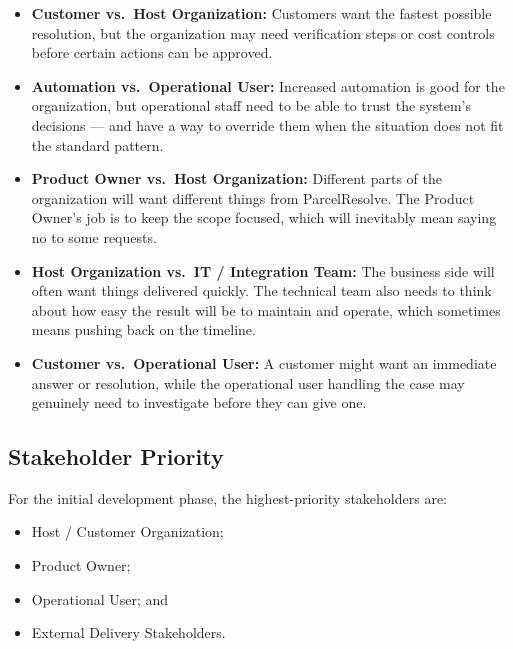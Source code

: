 \documentclass[11pt,a4paper]{article}
\begin{document}
\begin{itemize}

    \item \textbf{Customer vs.\ Host Organization:}
    Customers want the fastest possible resolution, but the
    organization may need verification steps or cost controls before
    certain actions can be approved.

    \item \textbf{Automation vs.\ Operational User:}
    Increased automation is good for the organization, but
    operational staff need to be able to trust the system's
    decisions --- and have a way to override them when the situation
    does not fit the standard pattern.

    \item \textbf{Product Owner vs.\ Host Organization:}
    Different parts of the organization will want different things
    from ParcelResolve. The Product Owner's job is to keep the scope
    focused, which will inevitably mean saying no to some requests.

    \item \textbf{Host Organization vs.\ IT / Integration Team:}
    The business side will often want things delivered quickly.
    The technical team also needs to think about how easy the result
    will be to maintain and operate, which sometimes means pushing
    back on the timeline.

    \item \textbf{Customer vs.\ Operational User:}
    A customer might want an immediate answer or resolution, while
    the operational user handling the case may genuinely need to
    investigate before they can give one.

\end{itemize}


\subsection{Stakeholder Priority}

For the initial development phase, the highest-priority stakeholders
are:

\begin{itemize}
    \item Host / Customer Organization;
    \item Product Owner;
    \item Operational User; and
    \item External Delivery Stakeholders.
\end{itemize}
\end{document}
